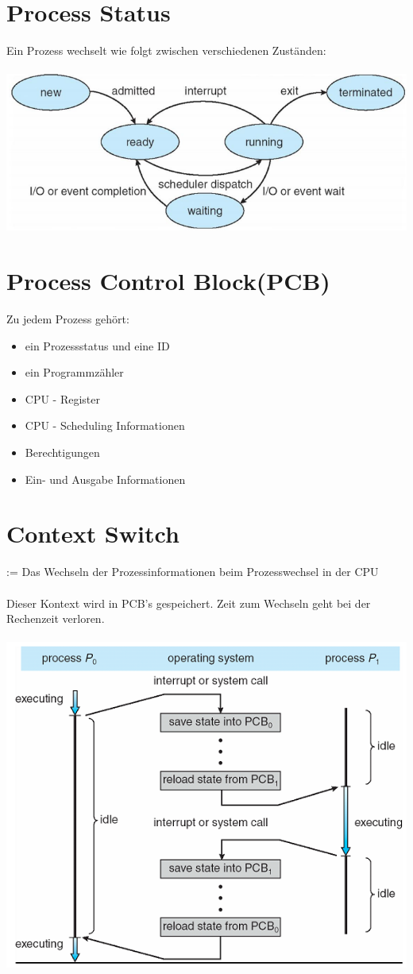 \documentclass[a4paper]{scrreprt}
\begin{document}
\section{Process Status}
	Ein Prozess wechselt wie folgt zwischen verschiedenen Zuständen:\\ \\
	\includegraphics[scale = 0.4]{graphics/prozess_status.png}
\section{Process Control Block(PCB)}
	Zu jedem Prozess gehört:
	\begin{itemize}
		\item ein Prozessstatus und eine ID
		\item ein Programmzähler
		\item CPU - Register
		\item CPU - Scheduling Informationen
		\item Berechtigungen
		\item Ein- und Ausgabe Informationen
	\end{itemize}
\section{Context Switch}
	:= Das Wechseln der Prozessinformationen beim Prozesswechsel in der CPU\\ \\
	Dieser Kontext wird in PCB's gespeichert. Zeit zum Wechseln geht bei der Rechenzeit verloren.\\ \\
	\includegraphics[scale = 0.6]{graphics/process_switch.png}\\
\end{document}
